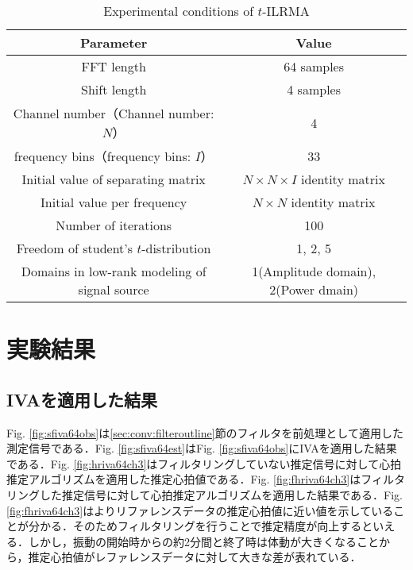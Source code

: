 \begin{table}[t] 
  \caption{Experimental conditions of $t$-ILRMA}
  \centering
  \begin{tabular}{cc}\hline
    Parameter & Value \\ \hline \hline
    FFT length & 64 samples  \\ \hline
    Shift length & 4 samples \\ \hline
    Channel number（Channel number: $N$） & 4 \\ \hline
    frequency bins（frequency bins: $I$） & 33 \\ \hline
    Initial value of separating matrix & $N \times N \times I$ identity matrix  \\ \hline
    Initial value per frequency & $N \times N$ identity matrix  \\ \hline
    Number of iterations & 100\\ \hline
    Freedom of student's $t$-distribution & 1, 2, 5\\ \hline
    Domains in low-rank modeling of signal source & 1(Amplitude domain), 2(Power dmain)\\ \hline
  \end{tabular}
  \label{tab:tilrma}
\end{table}

\section{実験結果}
\label{sec:conv:expresult5}

\subsection{IVAを適用した結果}
\label{sec:conv:resultiva}
Fig. \ref{fig:sfiva64obs}は\ref{sec:conv:filteroutline}節のフィルタを前処理として適用した測定信号である．Fig. \ref{fig:sfiva64est}はFig. \ref{fig:sfiva64obs}にIVAを適用した結果である．Fig. \ref{fig:hriva64ch3}はフィルタリングしていない推定信号に対して心拍推定アルゴリズムを適用した推定心拍値である．Fig. \ref{fig:fhriva64ch3}はフィルタリングした推定信号に対して心拍推定アルゴリズムを適用した結果である．Fig. \ref{fig:fhriva64ch3}はよりリファレンスデータの推定心拍値に近い値を示していることが分かる．そのためフィルタリングを行うことで推定精度が向上するといえる．しかし，振動の開始時からの約2分間と終了時は体動が大きくなることから，推定心拍値がレファレンスデータに対して大きな差が表れている．

